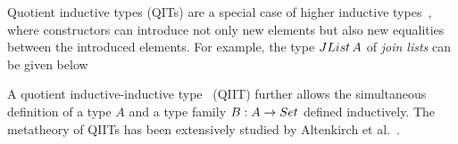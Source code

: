 \documentclass[a4paper,UKenglish,numberwithinsect,cleveref,thm-restate]{lipics-v2021}
\begin{document}
Quotient inductive types (QITs) are a special case of higher inductive types~\cite{Lumsdaine2020}, where constructors can introduce not only new elements but also new equalities between the introduced elements.
%
%
For example, the type $\JList{A}$ of \emph{join lists} can be given below
A quotient inductive-inductive type~\cite{Altenkirch2018} (QIIT) further allows the simultaneous definition of a type $A$ and a type family $B : A \to \Set$ defined inductively.
The metatheory of QIITs has been extensively studied by Altenkirch et al.~\cite{Kaposi2018,Kaposi2019,Kovacs2020}.
\end{document}
